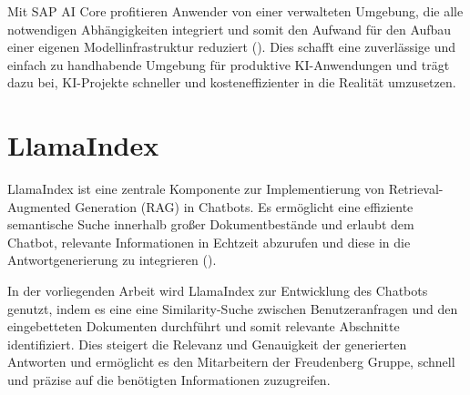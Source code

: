 Mit SAP AI Core profitieren Anwender von einer verwalteten Umgebung, die alle notwendigen Abhängigkeiten integriert und somit den Aufwand für den Aufbau einer eigenen Modellinfrastruktur reduziert (\cite{sap2024aiCore}).
Dies schafft eine zuverlässige und einfach zu handhabende Umgebung für produktive \ac{KI}-Anwendungen und trägt dazu bei, \ac{KI}-Projekte schneller und kosteneffizienter in die Realität umzusetzen.

\section{LlamaIndex}

LlamaIndex ist eine zentrale Komponente zur Implementierung von Retrieval-Augmented Generation (\ac{RAG}) in Chatbots. 
Es ermöglicht eine effiziente semantische Suche innerhalb großer Dokumentbestände und erlaubt dem Chatbot, relevante Informationen in Echtzeit abzurufen und diese in die Antwortgenerierung zu integrieren (\cite{llamaindex}).

In der vorliegenden Arbeit wird LlamaIndex zur Entwicklung des Chatbots genutzt, indem es eine eine Similarity-Suche zwischen Benutzeranfragen und den eingebetteten Dokumenten durchführt und somit relevante Abschnitte identifiziert. 
Dies steigert die Relevanz und Genauigkeit der generierten Antworten und ermöglicht es den Mitarbeitern der Freudenberg Gruppe, schnell und präzise auf die benötigten Informationen zuzugreifen.